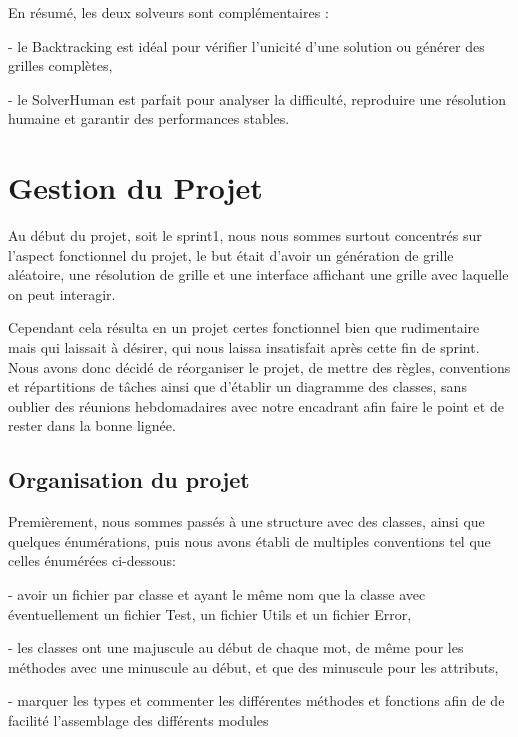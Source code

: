 \documentclass[a4paper]{article}
\begin{document}
En résumé, les deux solveurs sont complémentaires :

- le Backtracking est idéal pour vérifier l’unicité d’une solution ou générer des grilles complètes,

- le SolverHuman est parfait pour analyser la difficulté, reproduire une résolution humaine et garantir des performances stables.

\vspace{0.5cm}

\section{Gestion du Projet}
Au début du projet, soit le sprint1, nous nous sommes surtout concentrés sur l'aspect fonctionnel du projet, le but était d'avoir un génération de grille aléatoire, une résolution de grille et une interface affichant une grille avec laquelle on peut interagir. 

Cependant cela résulta en un projet certes fonctionnel bien que rudimentaire mais qui laissait à désirer, qui nous laissa insatisfait après cette fin de sprint. Nous avons donc décidé de réorganiser le projet, de mettre des règles, conventions et répartitions de tâches ainsi que d'établir un diagramme des classes, sans oublier des réunions hebdomadaires avec notre encadrant afin faire le point et de rester dans la bonne lignée.

\subsection{Organisation du projet}
Premièrement, nous sommes passés à une structure avec des classes, ainsi que quelques énumérations, puis nous avons établi de multiples conventions tel que celles énumérées ci-dessous:

- avoir un fichier par classe et ayant le même nom que la classe avec éventuellement un fichier Test, un fichier Utils et un fichier Error,

- les classes ont une majuscule au début de chaque mot, de même pour les méthodes avec une minuscule au début, et que des minuscule pour les attributs,

- marquer les types et commenter les différentes méthodes et fonctions afin de de facilité l'assemblage des différents modules


\end{document}
